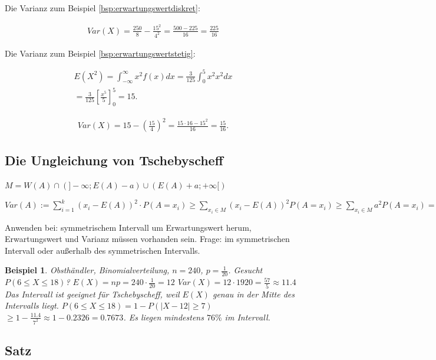 \documentclass{tufte-handout}
\theoremstyle{own}
\newtheorem{example}{Beispiel}[]
\begin{document}
Die Varianz zum Beispiel \autoref{bsp:erwartungswertdiskret}:

\begin{gather*}
Var(X) = \frac{250}{8} - \frac{15^2}{4^2} = \frac{500-225}{16} = \frac{225}{16}
\end{gather*}

Die Varianz zum Beispiel \autoref{bsp:erwartungswertstetig}:

\begin{gather*}
E(X^2) = \int_{-\infty}^\infty x^2 f(x) dx = \frac{3}{125} \int_0^5 x^2 x^2 dx \\
= \frac{3}{125} [\frac{x^5}{5}]_0^5 = 15.
\end{gather*}

\begin{gather*}
Var(X) = 15 - (\frac{15}{4})^2 = \frac{15 \cdot 16 - 15^2}{16} = \frac{15}{16}.
\end{gather*}

\subsection{Die Ungleichung von Tschebyscheff}

$M = W(A) \cap (]-\infty; E(A) - a) \cup (E(A)+a; +\infty [)$

$Var(A) := \sum_{i=1}^k (x_i - E(A))^2 \cdot P(A = x_i) \ge \sum_{x_i \in M}
(x_i - E(A))^2 P(A=x_i) \ge \sum_{x_i \in M} a^2 P(A=x_i) = a^2 \sum_{x_i \in M}
P(A = x_i) = P(|A - E(A)| \ge a)$

Anwenden bei: symmetrischem Intervall um Erwartungswert herum, Erwartungswert
und Varianz müssen vorhanden sein. Frage: im symmetrischen Intervall oder
außerhalb des symmetrischen Intervalls.

\begin{example}
	Obsthändler, Binomialverteilung, $n=240$, $p=\frac{1}{20}$.
	Gesucht $P(6 \le X \le 18)$?
	$E(X) = np = 240 \cdot \frac{1}{20} = 12$
	$Var(X) = 12 \cdot {19}{20} = \frac{57}{5} \approx 11.4$
	Das Intervall ist geeignet für Tschebyscheff, weil $E(X)$ genau in der Mitte
	des Intervalls liegt.
	$P(6 \le X \le 18) = 1 - P(|X - 12| \ge 7)$
	$\ge 1 - \frac{11.4}{7^2} \approx 1 - 0.2326 = 0.7673$.
	Es liegen \emph{mindestens} $76\%$ im Intervall.
\end{example}

\subsection{Satz}
\end{document}
